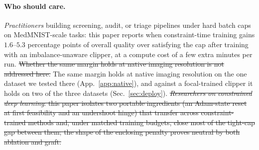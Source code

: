 \documentclass[10pt]{article}
\newcommand{\del}[1]{{\color{red}\sout{#1}}}
\begin{document}
\paragraph{Who should care.}
\emph{Practitioners} building screening, audit, or triage pipelines under
hard batch caps on MedMNIST-scale tasks: this paper reports when
constraint-time training gains $1.6$--$5.3$ percentage points of overall
quality over satisfying the cap after training{\color{blue} with an
imbalance-unaware clipper}, at a compute cost of a few
extra minutes per run. \del{Whether the same margin holds at native imaging
resolution is not addressed here.}
{\color{blue}The same margin holds at native imaging resolution on the one
dataset we tested there (App.~\ref{app:native}), and against a focal-trained
clipper it holds on two of the three datasets (Sec.~\ref{sec:deploy}).}
\del{\emph{Researchers on constrained deep learning}: this paper isolates two
portable ingredients (an Adam-state reset at first feasibility and an
undershoot hinge) that transfer across constraint-trained methods and,
under matched training budgets, close most of the tight-cap gap between
them; the shape of the enclosing penalty proves neutral by both ablation
and graft.}
\end{document}
